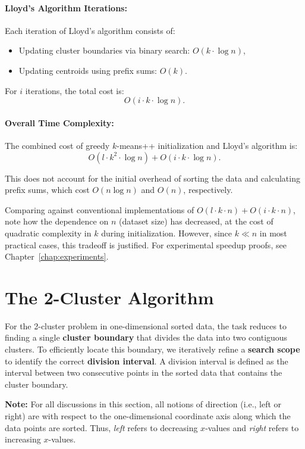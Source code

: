 \paragraph{Lloyd’s Algorithm Iterations:}
Each iteration of Lloyd’s algorithm consists of:
\begin{itemize}
    \item Updating cluster boundaries via binary search: \(O(k \cdot \log n)\),
    \item Updating centroids using prefix sums: \(O(k)\).
\end{itemize}
For \(i\) iterations, the total cost is:
\[
O(i \cdot k \cdot \log n).
\]

\paragraph{Overall Time Complexity:}
The combined cost of greedy $k$-means++ initialization and Lloyd’s algorithm is:
\[
O(l \cdot k^2  \cdot \log n) + O(i \cdot k \cdot \log n).
\]

This does not account for the initial overhead of sorting the data and calculating prefix sums, which cost $O(n \log n)$ and $O(n)$, respectively.

Comparing against conventional implementations of $O(l \cdot k \cdot n) + O(i \cdot k \cdot n)$, note how the dependence on $n$ (dataset size) has decreased, at the cost of quadratic complexity in $k$ during initialization. However, since $k \ll n$ in most practical cases, this tradeoff is justified. For experimental speedup proofs, see Chapter~\ref{chap:experiments}.

\section{The 2-Cluster Algorithm}

For the 2-cluster problem in one-dimensional sorted data, the task reduces to finding a single \textbf{cluster boundary} that divides the data into two contiguous clusters. To efficiently locate this boundary, we iteratively refine a \textbf{search scope} to identify the correct \textbf{division interval}. A division interval is defined as the interval between two consecutive points in the sorted data that contains the cluster boundary.

\textbf{Note:} For all discussions in this section, all notions of direction (i.e., left or right) are with respect to the one-dimensional coordinate axis along which the data points are sorted. Thus, \emph{left} refers to decreasing \(x\)-values and \emph{right} refers to increasing \(x\)-values.

